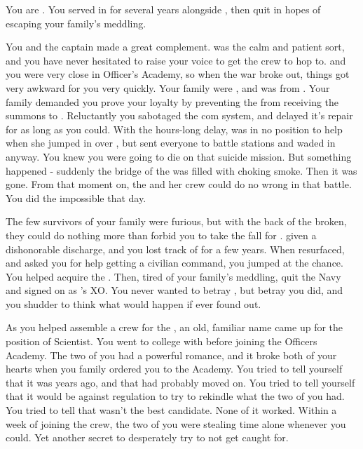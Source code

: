 \documentclass[char]{TMFHope}
\begin{document}
\name{\cXO{}}

You are \cXO{\full}. You served in \pTMN{} for several years alongside \cCap{\full}, then quit in hopes of escaping your family's meddling. 

You and the captain made a great complement. \cCap{} was the calm and patient sort, and you have never hesitated to raise your voice to get the crew to hop to. \cCap{} and you were very close in Officer's Academy, so when the war broke out, things got very awkward for you very quickly. Your family were \pEdge{}, and \cCap{} was from \pHome{}. Your family demanded you prove your loyalty by preventing the \pOld{} from receiving the summons to \pBattle{}. Reluctantly you sabotaged the \pOld{} com system, and delayed it's repair for as long as you could. With the hours-long delay, \pOld{} was in no position to help when she jumped in over \pHome{}, but \cCap{} sent everyone to battle stations and waded in anyway. You knew you were going to die on that suicide mission. But something happened - suddenly the bridge of the \pOld{} was filled with choking smoke. Then it was gone. From that moment on, the \pOld{} and her crew could do no wrong in that battle. You did the impossible that day.

The few survivors of your family were furious, but with the back of the \pEdge{} broken, they could do nothing more than forbid you to take the fall for \cCap{}. \cCap{\They} \cCap{\were} given a dishonorable discharge, and you lost track of \cCap{\them} for a few years. When \cCap{\they} resurfaced, and asked you for help getting a civilian command, you jumped at the chance. You helped \cCap{} acquire the \pNew{}. Then, tired of your family's meddling, quit the Navy and signed on as \cCap{}'s XO. You never wanted to betray \cCap{\them}, but betray you did, and you shudder to think what would happen if \cCap{} ever found out.

As you helped \cCap{} assemble a crew for the \pNew{}, an old, familiar name came up for the position of Scientist. You went to college with \cSci{} before joining the Officers Academy. The two of you had a powerful romance, and it broke both of your hearts when you family ordered you to the Academy. You tried to tell yourself that it was years ago, and that \cSci{} had probably moved on. You tried to tell yourself that it would be against regulation to try to rekindle what the two of you had. You tried to tell \cCap{} that \cSci{} wasn't the best candidate. None of it worked. Within a week of \cSci{} joining the crew, the two of you were stealing time alone whenever you could. Yet another secret to desperately try to not get caught for.
\end{document}
